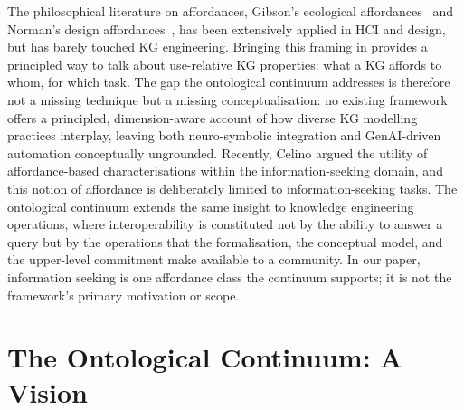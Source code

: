 \documentclass[runningheads]{llncs}
\newcommand{\add}[1]{\textcolor{addedcolor}{#1}}
\begin{document}
\add{The philosophical literature on affordances, Gibson's ecological
affordances~\cite{gibson} and Norman's design affordances~\cite{norman}, has been extensively applied in HCI and design, but has barely
touched KG engineering. Bringing this framing in provides a principled
way to talk about use-relative KG properties: what a KG affords to whom,
for which task. The gap the ontological continuum addresses is therefore
not a missing technique but a missing conceptualisation: no existing
framework offers a principled, dimension-aware account of how diverse KG
modelling practices interplay, leaving both neuro-symbolic integration
and GenAI-driven automation conceptually ungrounded.}
\add{Recently, Celino \cite{celino2026affordances} argued the utility of affordance-based characterisations within the information-seeking domain, and this notion of affordance is deliberately limited to information-seeking tasks. The ontological continuum extends the same insight to knowledge engineering operations, where interoperability is constituted not by the ability to answer a query but by the operations that the formalisation, the conceptual model, and the upper-level commitment make available to a community. In our paper, information seeking is one affordance class the continuum supports; it is not the framework's primary motivation or scope.}
\section{The Ontological Continuum: A Vision}
\end{document}
